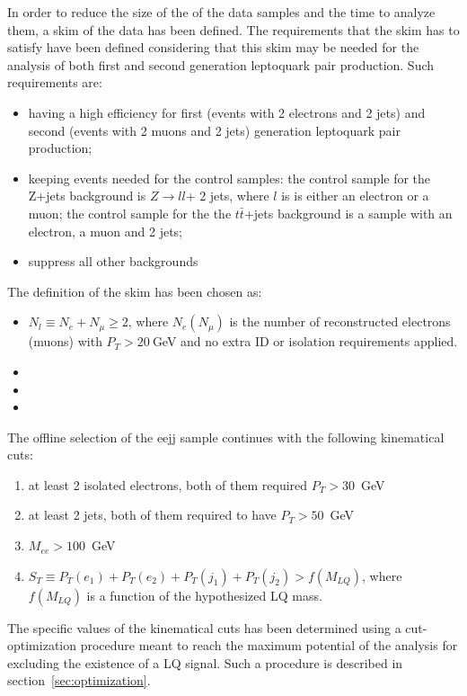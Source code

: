 In order to reduce the size of the of the data samples and the time to analyze them, a skim of the 
data has been defined.
The requirements that the skim has to satisfy have been defined considering that this skim may be needed
for the analysis of both first and second generation leptoquark pair production. Such requirements are:
\begin{itemize}
\item having a high efficiency for first (events with 2 electrons and 2 jets) and second (events with 
2 muons and 2 jets) generation leptoquark pair production;
\item keeping events needed for the control samples: the control sample for the Z+jets background is $Z\rightarrow l l$+ 2 jets,
where $l$ is is either an electron or a muon; the control sample for the the $t\bar{t}$+jets background is a sample 
with an electron, a muon and 2 jets;
\item suppress all other backgrounds
\end{itemize}
The definition of the skim has been chosen as:
\begin{itemize}
\item $N_l \equiv N_e + N_{\mu} \ge 2$, where $N_e (N_{\mu})$ is the number of reconstructed electrons (muons)
with $P_T>20~$GeV and no extra ID or isolation requirements applied.
\item 
\item 
\item 
\end{itemize}




The offline selection of the eejj sample continues with the following kinematical cuts:
%
\begin{enumerate}
\item at least 2 isolated electrons, both of them required $P_T>30$~GeV 
\item at least 2 jets, both of them required to have $P_T>50$~GeV
\item $M_{ee}>100$~GeV
\item $S_T\equiv P_T(e_1)+P_T(e_2)+P_T(j_1)+P_T(j_2)>f(M_{LQ})$, where $f(M_{LQ})$ is a function 
of the hypothesized LQ mass.
\end{enumerate}
%

The specific values of the kinematical cuts has been determined using a cut-optimization procedure meant to
reach the maximum potential of the analysis for excluding the existence of a LQ signal. 
Such a procedure is described in section~\ref{sec:optimization}.

